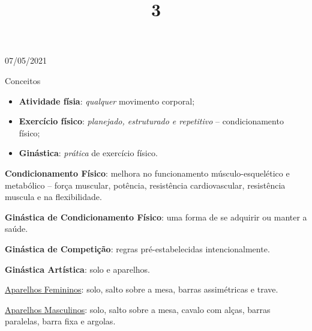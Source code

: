 \documentclass{SchoolBook}
\begin{document}
    \begin{day}{07/05/2021}
        \title{3}{Conceitos}
        
        \begin{itemize}
            \item \textbf{Atividade físia}: \textit{qualquer} movimento corporal;
            \item \textbf{Exercício físico}: \textit{planejado, estruturado e repetitivo} -- condicionamento físico;
            \item \textbf{Ginástica}: \textit{prática} de exercício físico.
        \end{itemize}
        
        \textbf{Condicionamento Físico}: melhora no funcionamento músculo-esquelético e metabólico -- força muscular, potência, resistência cardiovascular, resistência muscula e na flexibilidade.
        
        \textbf{Ginástica de Condicionamento Físico}: uma forma de se adquirir ou manter a saúde.
        
        \textbf{Ginástica de Competição}: regras pré-estabelecidas intencionalmente.
        
        \textbf{Ginástica Artística}: solo e aparelhos.
        
        \underline{Aparelhos Femininos}: solo, salto sobre a mesa, barras assimétricas e trave.
        
        \underline{Aparelhos Masculinos}: solo, salto sobre a mesa, cavalo com alças, barras paralelas, barra fixa e argolas.
    \end{day}
    
\end{document}
